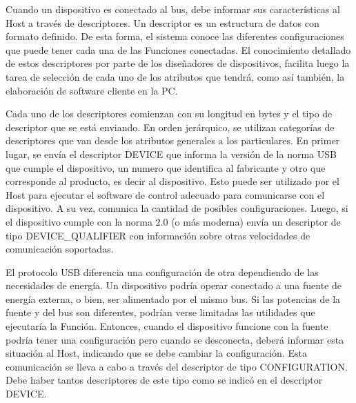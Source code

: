 %

Cuando un dispositivo es conectado al bus, debe informar sus características al Host a través de descriptores. Un descriptor es un estructura de datos con formato definido. De esta forma, el sistema conoce las diferentes configuraciones que puede tener cada una de las Funciones conectadas. El conocimiento detallado de estos descriptores por parte de los diseñadores de dispositivos, facilita luego la tarea de selección de cada uno de los atributos que tendrá, como así también, la elaboración de software cliente en la PC.%

Cada uno de los descriptores comienzan con su longitud en bytes y el tipo de descriptor que se está enviando. En orden jerárquico, se utilizan categorías de descriptores que van desde los atributos generales a los particulares. En primer lugar, se envía el descriptor DEVICE que informa la versión de la norma USB que cumple el dispositivo, un numero que identifica al fabricante y otro que corresponde al producto, es decir al dispositivo. Esto puede ser utilizado por el Host para ejecutar el software de control adecuado para comunicarse con el dispositivo. A su vez, comunica la cantidad de posibles configuraciones. Luego, si el dispositivo cumple con la norma 2.0 (o más moderna) envía un descriptor de tipo DEVICE\_QUALIFIER con información sobre otras velocidades de comunicación soportadas.%

El protocolo USB diferencia una configuración de otra dependiendo de las necesidades de energía. Un dispositivo podría operar conectado a una fuente de energía externa, o bien, ser alimentado por el mismo bus. Si las potencias de la fuente y del bus son diferentes, podrían verse limitadas las utilidades que ejecutaría la Función. Entonces, cuando el dispositivo funcione con la fuente podría tener una configuración pero cuando se desconecta, deberá informar esta situación al Host, indicando que se debe cambiar la configuración. Esta comunicación se lleva a cabo a través del descriptor de tipo CONFIGURATION. Debe haber tantos descriptores de este tipo como se indicó en el descriptor DEVICE.%

